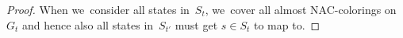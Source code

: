 \begin{proof}
	When we~consider all states in~\( S_t \), we~cover all almost NAC-colorings on \( G_t \)
	and hence also all states in~\( S_{t'} \) must get \( s \in S_t \) to map to.
\end{proof}
%

\subsubsection*{\IntroduceEdgeNode{}}

